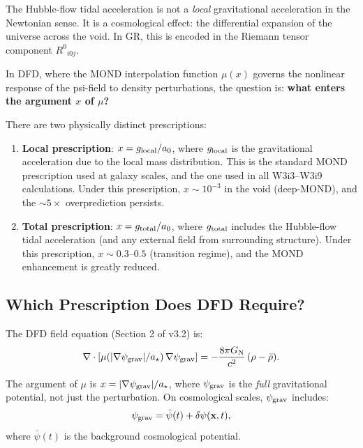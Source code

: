 \documentclass[11pt,a4paper]{article}
\newcommand{\aM}{a_0}
\newcommand{\mufd}{\mu}
\newcommand{\psigrav}{\psi_{\rm grav}}
\newcommand{\GN}{G_{\rm N}}
\begin{document}
The Hubble-flow tidal acceleration is not a \emph{local} gravitational
acceleration in the Newtonian sense. It is a cosmological effect:
the differential expansion of the universe across the void. In GR,
this is encoded in the Riemann tensor component $R^0{}_{i0j}$.

In DFD, where the MOND interpolation function $\mufd(x)$ governs the
nonlinear response of the psi-field to density perturbations, the
question is: \textbf{what enters the argument $x$ of $\mufd$?}

There are two physically distinct prescriptions:

\begin{enumerate}
\item \textbf{Local prescription}: $x = g_{\rm local}/\aM$, where
  $g_{\rm local}$ is the gravitational acceleration due to the
  local mass distribution. This is the standard MOND prescription
  used at galaxy scales, and the one used in all W3i3--W3i9
  calculations. Under this prescription, $x \sim 10^{-3}$ in the
  void (deep-MOND), and the $\sim 5\times$ overprediction persists.

\item \textbf{Total prescription}: $x = g_{\rm total}/\aM$, where
  $g_{\rm total}$ includes the Hubble-flow tidal acceleration (and
  any external field from surrounding structure). Under this
  prescription, $x \sim 0.3$--$0.5$ (transition regime), and the
  MOND enhancement is greatly reduced.
\end{enumerate}

\subsection{Which Prescription Does DFD Require?}

The DFD field equation (Section 2 of v3.2) is:
\begin{equation}
\nabla\cdot[\mufd(|\nabla\psigrav|/a_\star)\,\nabla\psigrav]
= -\frac{8\pi\GN}{c^2}\,(\rho - \bar{\rho}).
\label{eq:DFD-field}
\end{equation}

The argument of $\mufd$ is $x = |\nabla\psigrav|/a_\star$, where
$\psigrav$ is the \emph{full} gravitational potential, not just the
perturbation. On cosmological scales, $\psigrav$ includes:
\begin{equation}
\psigrav = \bar{\psi}(t) + \delta\psi(\mathbf{x},t),
\end{equation}
where $\bar{\psi}(t)$ is the background cosmological potential.
\end{document}
